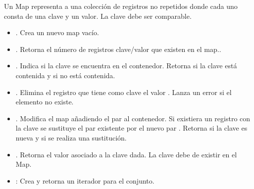 

\begin{definition}[Map]{}\label{def:Map}

Un Map representa a una colección de registros no repetidos donde cada uno consta de una clave y un valor. La clave debe ser comparable.

\begin{itemize}
\item {}. Crea un nuevo map vacío.

\item {}. Retorna el número de registros clave/valor que existen en el map..

\item {}. Indica si la clave  se encuentra en el contenedor. Retorna  si la clave está contenida y  si no está contenida.


\item {}. Elimina el registro que tiene como clave el valor . Lanza un error si el elemento no existe.


\item {}. Modifica el map añadiendo el par  al contenedor. Si existiera un registro con la clave  se sustituye el par  existente por el nuevo par . Retorna  si la clave es nueva y  si se realiza una sustitución.


\item {}.  Retorna el valor asociado a la clave dada. La clave debe de existir en el Map.

\item {}: Crea y retorna un iterador para el conjunto.
\end{itemize}
\end{definition}
